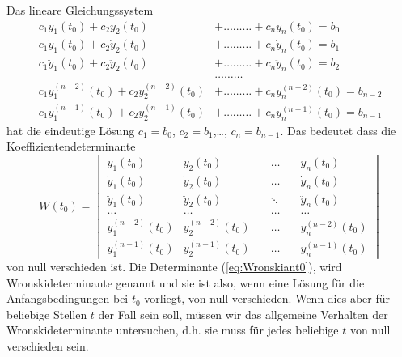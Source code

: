 Das lineare Gleichungssystem
\begin{align}
c_1y_1(t_0)+c_2y_2(t_0)&+{\dots\dots\dots}+c_ny_n(t_0)=b_0\nonumber\\
c_1\dot{y}_1(t_0)+c_2\dot{y}_2(t_0)&+{\dots\dots\dots}+c_n\dot{y}_n(t_0)=b_1\nonumber\\
c_1\ddot{y}_1(t_0)+c_2\ddot{y}_2(t_0)&+{\dots\dots\dots}+c_n\ddot{y}_n(t_0)=b_2\nonumber\\
  &\dots\dots\dots \\
  c_1y^{(n-2)}_1(t_0)+c_2y^{(n-2)}_2(t_0)&+{\dots\dots\dots}+c_ny^{(n-2)}_n(t_0)=b_{n-2}\nonumber\\
  c_1y^{(n-1)}_1(t_0)+c_2y^{(n-1)}_2(t_0)&+{\dots\dots\dots}+c_ny^{(n-1)}_n(t_0)=b_{n-1}\nonumber
  \label{eq:LGSatt0}
\end{align}
hat die eindeutige Lösung $c_1=b_0$, $c_2=b_1$,\dots, $c_n=b_{n-1}$. Das
bedeutet dass die Koeffizientendeterminante
\begin{equation}
  W(t_0)=\begin{vmatrix}
           y_1(t_0)&y_2(t_0)&\quad\dots\quad &y_n(t_0)\\
           \dot{y}_1(t_0)&\dot{y}_2(t_0)&\quad\dots\quad &\dot{y}_n(t_0)\\
           \ddot{y}_1(t_0)&\ddot{y}_2(t_0)&\quad\ddots\quad &\ddot{y}_n(t_0)\\
	   \dots&\dots &\quad\dots\quad&\dots\\
           y^{(n-2)}_1(t_0)&y^{(n-2)}_2(t_0)&\quad\dots\quad &y^{(n-2)}_n(t_0)\\
           y^{(n-1)}_1(t_0)&y^{(n-1)}_2(t_0)&\quad\dots\quad &y^{(n-1)}_n(t_0)
         \end{vmatrix}
  \label{eq:Wronskiant0}
\end{equation}
von null verschieden ist. Die Determinante (\ref{eq:Wronskiant0}), wird
Wronskideterminante genannt und sie ist also, wenn eine Lösung für die
Anfangsbedingungen bei $t_0$ vorliegt, von null verschieden. Wenn dies aber für
beliebige Stellen $t$ der Fall sein soll, müssen wir das allgemeine Verhalten
der Wronskideterminante untersuchen, d.h. sie muss für jedes beliebige $t$ von
null verschieden sein.

